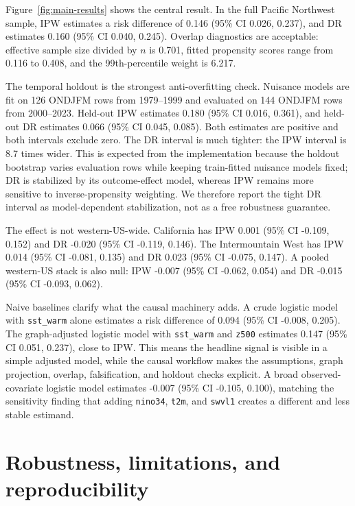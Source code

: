 \documentclass{article}
\begin{document}
Figure~\ref{fig:main-results} shows the central result. In the full Pacific Northwest sample, IPW estimates a risk difference of 0.146 (95\% CI 0.026, 0.237), and DR estimates 0.160 (95\% CI 0.040, 0.245). Overlap diagnostics are acceptable: effective sample size divided by $n$ is 0.701, fitted propensity scores range from 0.116 to 0.408, and the 99th-percentile weight is 6.217.

The temporal holdout is the strongest anti-overfitting check. Nuisance models are fit on 126 ONDJFM rows from 1979--1999 and evaluated on 144 ONDJFM rows from 2000--2023. Held-out IPW estimates 0.180 (95\% CI 0.016, 0.361), and held-out DR estimates 0.066 (95\% CI 0.045, 0.085). Both estimates are positive and both intervals exclude zero. The DR interval is much tighter: the IPW interval is 8.7 times wider. This is expected from the implementation because the holdout bootstrap varies evaluation rows while keeping train-fitted nuisance models fixed; DR is stabilized by its outcome-effect model, whereas IPW remains more sensitive to inverse-propensity weighting. We therefore report the tight DR interval as model-dependent stabilization, not as a free robustness guarantee.

The effect is not western-US-wide. California has IPW 0.001 (95\% CI -0.109, 0.152) and DR -0.020 (95\% CI -0.119, 0.146). The Intermountain West has IPW 0.014 (95\% CI -0.081, 0.135) and DR 0.023 (95\% CI -0.075, 0.147). A pooled western-US stack is also null: IPW -0.007 (95\% CI -0.062, 0.054) and DR -0.015 (95\% CI -0.093, 0.062).

Naive baselines clarify what the causal machinery adds. A crude logistic model with \texttt{sst\_warm} alone estimates a risk difference of 0.094 (95\% CI -0.008, 0.205). The graph-adjusted logistic model with \texttt{sst\_warm} and \texttt{z500} estimates 0.147 (95\% CI 0.051, 0.237), close to IPW. This means the headline signal is visible in a simple adjusted model, while the causal workflow makes the assumptions, graph projection, overlap, falsification, and holdout checks explicit. A broad observed-covariate logistic model estimates -0.007 (95\% CI -0.105, 0.100), matching the sensitivity finding that adding \texttt{nino34}, \texttt{t2m}, and \texttt{swvl1} creates a different and less stable estimand.

\section{Robustness, limitations, and reproducibility}
\end{document}
